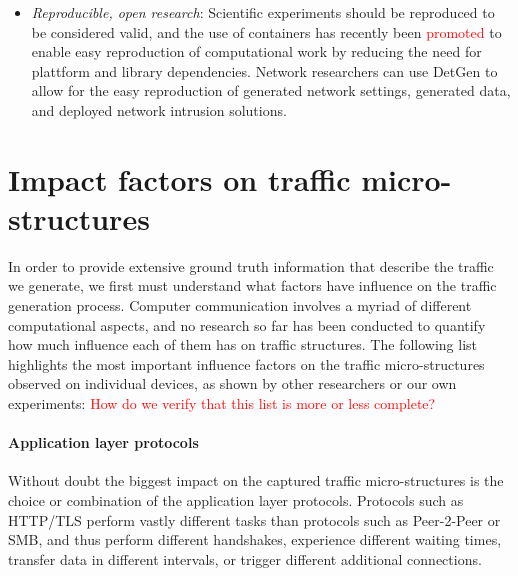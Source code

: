 \documentclass{article}
\begin{document}
\begin{itemize}
\item \textit{Reproducible, open research}: Scientific experiments should be reproduced to be considered valid, and the use of containers has recently been \textcolor{red}{promoted} to enable easy reproduction of computational work by reducing the need for plattform and library dependencies. Network researchers can use DetGen to allow for the easy reproduction of generated network settings, generated data, and deployed network intrusion solutions. 

\end{itemize}



\section{Impact factors on traffic micro-structures}\label{Sec:Impactfactors}

In order to provide extensive ground truth information that describe the traffic we generate, we first must understand what factors have influence on the traffic generation process. 
Computer communication involves a myriad of different computational aspects, and no research so far has been conducted to quantify how much influence each of them has on traffic structures. The following list highlights the most important influence factors on the traffic micro-structures observed on individual devices, as shown by other researchers or our own experiments:
\textcolor{red}{How do we verify that this list is more or less complete?}

\paragraph{Application layer protocols} 
Without doubt the biggest impact on the captured traffic micro-structures is the choice or combination of the application layer protocols. Protocols such as HTTP/TLS perform vastly different tasks than protocols such as Peer-2-Peer or SMB, and thus perform different handshakes, experience different waiting times, transfer data in different intervals, or trigger different additional connections. 
 
 
\end{document}
